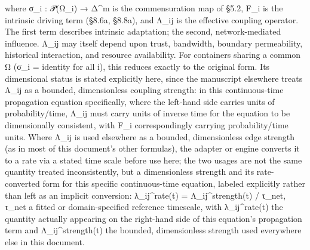 \documentclass[
]{article}
\begin{document}
where σ\_i : 𝒫(Ω\_i) → Δ\^{}m is the commensuration map of §5.2, F\_i is
the intrinsic driving term (§8.6a, §8.8a), and Λ\_ij is the effective
coupling operator. The first term describes intrinsic adaptation; the
second, network-mediated influence. Λ\_ij may itself depend upon trust,
bandwidth, boundary permeability, historical interaction, and resource
availability. For containers sharing a common Ω (σ\_i = identity for all
i), this reduces exactly to the original form. Its dimensional status is
stated explicitly here, since the manuscript elsewhere treats Λ\_ij as a
bounded, dimensionless coupling strength: in this continuous-time
propagation equation specifically, where the left-hand side carries
units of probability/time, Λ\_ij must carry units of inverse time for
the equation to be dimensionally consistent, with F\_i correspondingly
carrying probability/time units. Where Λ\_ij is used elsewhere as a
bounded, dimensionless edge strength (as in most of this document's
other formulas), the adapter or engine converts it to a rate via a
stated time scale before use here; the two usages are not the same
quantity treated inconsistently, but a dimensionless strength and its
rate-converted form for this specific continuous-time equation, labeled
explicitly rather than left as an implicit conversion: λ\_ij\^{}rate(t)
= Λ\_ij\^{}strength(t) / τ\_net, τ\_net a fitted or domain-specified
reference timescale, with λ\_ij\^{}rate(t) the quantity actually
appearing on the right-hand side of this equation's propagation term and
Λ\_ij\^{}strength(t) the bounded, dimensionless strength used everywhere
else in this document.
\end{document}
